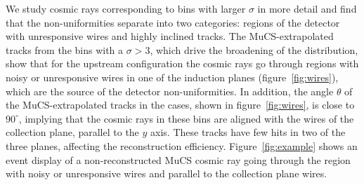 \documentclass[a4paper,11pt]{article}
\begin{document}
%

We study cosmic rays corresponding to bins with larger $\sigma$ in more detail and find that the non-uniformities separate into two categories: regions of the detector with unresponsive wires and highly inclined tracks. The MuCS-extrapolated tracks from the bins with a $\sigma>3$, which drive the broadening of the distribution, show that for the upstream configuration the cosmic rays go through regions with noisy or unresponsive wires in one of the induction planes (figure~\ref{fig:wires}), which are the source of the detector non-uniformities.
In addition, the angle $\theta$ of the MuCS-extrapolated tracks in the cases, shown in figure~\ref{fig:wires}, is close to $90^\circ$, implying that the cosmic rays in these bins are aligned with the wires of the collection plane, parallel to the $y$ axis. These tracks have few hits in two of the three planes, affecting the reconstruction efficiency. Figure~\ref{fig:example} shows an event display of a non-reconstructed MuCS cosmic ray going through the region with noisy or unresponsive wires and parallel to the collection plane wires.
\end{document}
